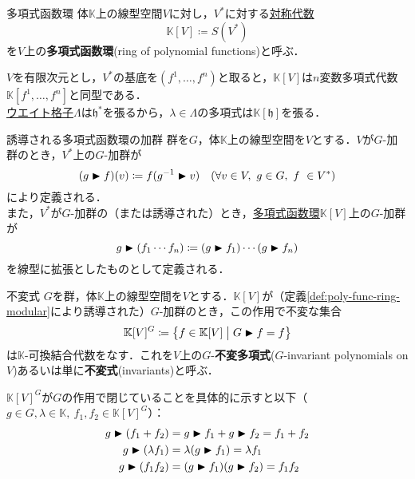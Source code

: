 \documentclass[rep_main]{subfiles}
\begin{document}
\begin{mydef}[label=def:polynomial-function-ring]{多項式函数環}
	体$\mathbb{K}$上の線型空間$V$に対し，$V^*$に対する\hyperref[def:sym-alg]{対称代数}
	\begin{equation}
		\mathbb{K}[V] \coloneqq S(V^*)
	\end{equation}
	を$V$上の\textbf{多項式函数環}(ring of polynomial functions)と呼ぶ．
\end{mydef}
$V$を有限次元とし，$V^*$の基底を$(f^1,\ldots , f^n)$と取ると，$\mathbb{K}[V]$は$n$変数多項式代数$\mathbb{K}[f^1, \ldots, f^n]$と同型である．\\
\hyperref[def:root-lattice]{ウエイト格子}$\Lambda$は$\mathfrak{h}^*$を張るから，$\lambda \in \Lambda$の多項式は$\mathbb{K}[\mathfrak{h}]$を張る．
\begin{mydef}[label=def:poly-func-ring-modular]{誘導される多項式函数環の加群}
	群を$G$，体$\mathbb{K}$上の線型空間を$V$とする．$V$が$G$-加群のとき，$V^*$上の$G$-加群が
	\begin{equation}
		(g \btr f)(v) \coloneqq f(g^{-1} \btr v)\quad  (\forall v \in V,\ g \in G,\ f \in V^*)
	\end{equation}
	により定義される．\\
	また，$V^*$が$G$-加群の（または誘導された）とき，\hyperref[def:polynomial-function-ring]{多項式函数環}$\mathbb{K}[V]$上の$G$-加群が
	\begin{equation}
		g \blacktriangleright (f_1 \cdots f_n) \coloneqq (g \blacktriangleright f_1) \cdots (g \blacktriangleright f_n)
	\end{equation}
	を線型に拡張としたものとして定義される．
\end{mydef}
\begin{mydef}[label=def:invariant-polynomial]{不変式}
	$G$を群，体$\mathbb{K}$上の線型空間を$V$とする．$\mathbb{K}[V]$が（定義\ref{def:poly-func-ring-modular}により誘導された）$G$-加群のとき，この作用で不変な集合
	\begin{equation}
		\mathbb{K}[V]^G \coloneqq \bigl\{f \in \mathbb{K}[V] \bigm| G \blacktriangleright f = f \bigr\}
	\end{equation}
	は$\mathbb{K}$-可換結合代数をなす．これを$V$上の$G$-\textbf{不変多項式}($G$-invariant polynomials on $V$)あるいは単に\textbf{不変式}(invariants)と呼ぶ．
\end{mydef}
$\mathbb{K}[V]^G$が$G$の作用で閉じていることを具体的に示すと以下（$g \in G, \lambda \in \mathbb{K},\ f_1, f_2 \in \mathbb{K}[V]^G$）：
\begin{align}
	g \blacktriangleright (f_1 + f_2) &= g \blacktriangleright f_1 + g \blacktriangleright f_2 = f_1 + f_2 \\
	g \blacktriangleright (\lambda f_1) &= \lambda (g \blacktriangleright f_1) = \lambda f_1 \\
	g \blacktriangleright (f_1f_2) &= (g \blacktriangleright f_1)(g \blacktriangleright f_2) = f_1f_2
\end{align}
\end{document}
